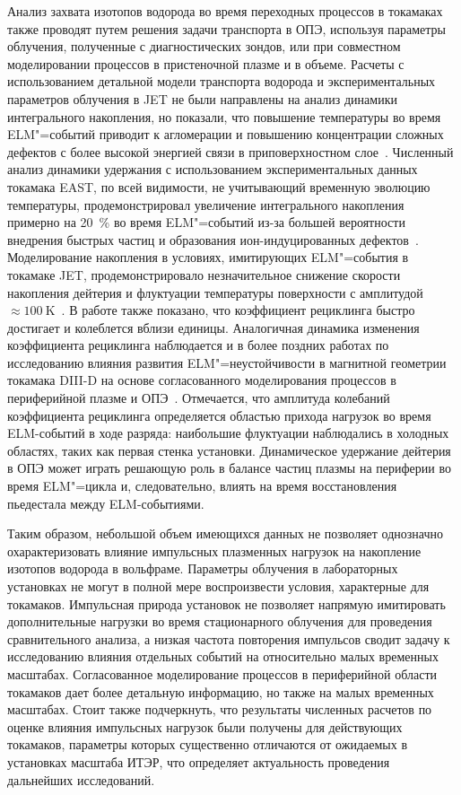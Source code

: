 Анализ захвата изотопов водорода во время переходных процессов в токамаках также проводят путем решения задачи транспорта в ОПЭ, используя параметры облучения, полученные с диагностических зондов, или при совместном моделировании процессов в пристеночной плазме и в объеме. Расчеты с использованием детальной модели транспорта водорода и экспериментальных параметров облучения в JET не были направлены на анализ динамики интегрального накопления, но показали, что повышение температуры во время ELM"=событий приводит к агломерации и повышению концентрации сложных дефектов с более высокой энергией связи в приповерхностном слое~\cite{Heinola2019}. Численный анализ динамики удержания с использованием экспериментальных данных токамака EAST, по всей видимости, не учитывающий временную эволюцию температуры, продемонстрировал увеличение интегрального накопления примерно на \SI{20}{\percent} во время ELM"=событий из-за большей вероятности внедрения быстрых частиц и образования ион-индуцированных дефектов~\cite{Sang2014}. Моделирование накопления в условиях, имитирующих ELM"=события в токамаке JET, продемонстрировало незначительное снижение скорости накопления дейтерия и флуктуации температуры поверхности с амплитудой \( \approx \SI{100}{\kelvin} \)~\cite{Schmid2016}. В работе также показано, что коэффициент рециклинга быстро достигает и колеблется вблизи единицы. Аналогичная динамика изменения коэффициента рециклинга наблюдается и в более поздних работах по исследованию влияния развития ELM"=неустойчивости в магнитной геометрии токамака DIII-D на основе согласованного моделирования процессов в периферийной плазме и ОПЭ~\cite{Smirnov2020,Lasa2024,Smirnov2024}. Отмечается, что амплитуда колебаний коэффициента рециклинга определяется областью прихода нагрузок во время ELM-событий в ходе разряда: наибольшие флуктуации наблюдались в холодных областях, таких как первая стенка установки. Динамическое удержание дейтерия в ОПЭ может играть решающую роль в балансе частиц плазмы на периферии во время ELM"=цикла и, следовательно, влиять на время восстановления пьедестала между ELM-событиями.

Таким образом, небольшой объем имеющихся данных не позволяет однозначно охарактеризовать влияние импульсных плазменных нагрузок на накопление изотопов водорода в вольфраме. Параметры облучения в лабораторных установках не могут в полной мере воспроизвести условия, характерные для токамаков. Импульсная природа установок не позволяет напрямую имитировать дополнительные нагрузки во время стационарного облучения для проведения сравнительного анализа, а низкая частота повторения импульсов сводит задачу к исследованию влияния отдельных событий на относительно малых временных масштабах. Согласованное моделирование процессов в периферийной области токамаков дает более детальную информацию, но также на малых временных масштабах. Стоит также подчеркнуть, что результаты численных расчетов по оценке влияния импульсных нагрузок были получены для действующих токамаков, параметры которых существенно отличаются от ожидаемых в установках масштаба ИТЭР, что определяет актуальность проведения дальнейших исследований.

